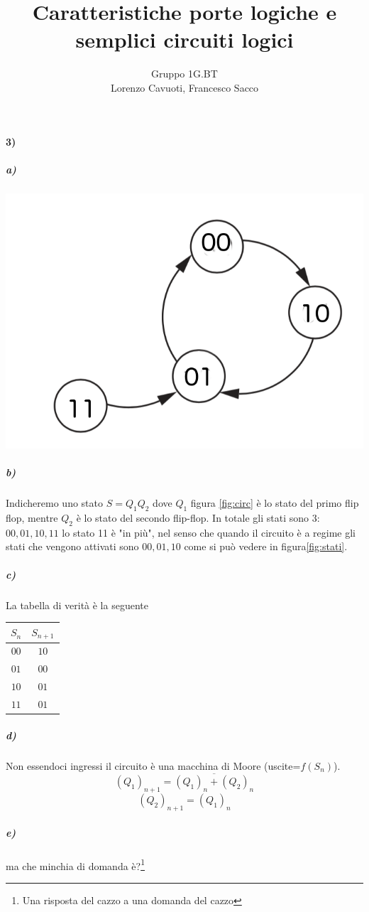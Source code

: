 \documentclass{article}
\date{}
\author{Gruppo 1G.BT \\Lorenzo Cavuoti, Francesco Sacco}
\title{Caratteristiche porte logiche e semplici circuiti logici}
\begin{document}
\maketitle
\paragraph{3)}
	\subparagraph{a)}
		\begin{center}
			\begin{minipage}{.7\linewidth}
				\includegraphics[width=0.5\linewidth]{foto/diagramma_a_stati}
				\label{fig:stati}
			\end{minipage}
		\end{center}
	\subparagraph{b)}
		Indicheremo uno stato $S=Q_1Q_2$ dove $Q_1$ figura \ref{fig:circ} è lo stato del primo flip flop, mentre $Q_2$ è lo stato del secondo flip-flop.\newline
		In totale gli stati sono 3: $00, 01, 10, 11$ lo stato 11 è "in più", nel senso che quando il circuito è a regime gli stati che vengono attivati sono $00,01,10$ come si può vedere in figura\ref{fig:stati}.
	\subparagraph{c)}
		La tabella di verità è la seguente\newline
		\begin{center}
		\begin{tabular}{cc}
			\hline
			$S_n$ & $S_{n+1}$\\
			\hline
			$00$ & $10$\\
			$01$ & $00$\\
			$10$ & $01$\\
			$11$ & $01$\\
			\hline
		\end{tabular}
		\end{center}
	\subparagraph{d)}
		Non essendoci ingressi il circuito è una macchina di Moore (uscite=$f(S_n)$).\newline
		\[
			(Q_1)_{n+1}=\overline{(Q_1)_n+(Q_2)_n}
		\]
		\[
			(Q_2)_{n+1}=(Q_1)_n
		\]
	\subparagraph{e)}
		ma che minchia di domanda è?\footnote{Una risposta del cazzo a una domanda del cazzo}
\end{document}
